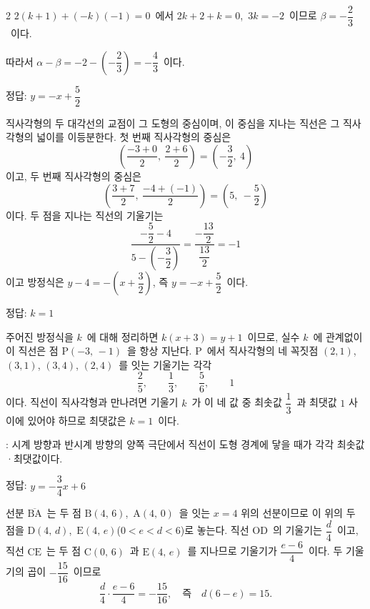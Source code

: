 \documentclass[10pt,fleqn]{article}
\begin{document}
\begin{multicols*}{2}
 $2(k+1) + (-k)(-1) = 0$\ 에서 $2k + 2 + k = 0$,\ $3k = -2$\ 이므로 $\beta = -\dfrac{2}{3}$\ 이다.

따라서 $\alpha - \beta = -2 - \left( -\dfrac{2}{3} \right) = -\dfrac{4}{3}$\ 이다.

\begin{dmanswerbox}
정답: $y=-x+\dfrac{5}{2}$
\end{dmanswerbox}

직사각형의 두 대각선의 교점이 그 도형의 중심이며, 이 중심을 지나는 직선은 그 직사각형의 넓이를 이등분한다. 첫 번째 직사각형의 중심은
\[ \left( \dfrac{-3+0}{2},\ \dfrac{2+6}{2} \right) = \left( -\dfrac{3}{2},\ 4 \right) \]
이고, 두 번째 직사각형의 중심은
\[ \left( \dfrac{3+7}{2},\ \dfrac{-4+(-1)}{2} \right) = \left( 5,\ -\dfrac{5}{2} \right) \]
이다. 두 점을 지나는 직선의 기울기는
\[ \dfrac{-\dfrac{5}{2} - 4}{5 - (-\dfrac{3}{2})} = \dfrac{-\dfrac{13}{2}}{\dfrac{13}{2}} = -1 \]
이고 방정식은 $y - 4 = -\left( x + \dfrac{3}{2} \right)$, 즉 $y = -x + \dfrac{5}{2}$\ 이다.
\begin{dmanswerbox}
정답: $k=1$
\end{dmanswerbox}

주어진 방정식을 $k$\ 에 대해 정리하면 $k(x + 3) = y + 1$\ 이므로, 실수 $k$\ 에 관계없이 이 직선은 점 $\mathrm{P}(-3,\, -1)$\ 을 항상 지난다. $\mathrm{P}$\ 에서 직사각형의 네 꼭짓점 $(2,1)$, $(3,1)$, $(3,4)$, $(2,4)$\ 를 잇는 기울기는 각각
$$\dfrac{2}{5},\qquad \dfrac{1}{3},\qquad \dfrac{5}{6},\qquad 1$$
이다. 직선이 직사각형과 만나려면 기울기 $k$\ 가 이 네 값 중 최솟값 $\dfrac{1}{3}$\ 과 최댓값 $1$ 사이에 있어야 하므로 최댓값은 $k = 1$\ 이다.

\begin{dmcriticalpoint}
: 시계 방향과 반시계 방향의 양쪽 극단에서 직선이 도형 경계에 닿을 때가 각각 최솟값·최댓값이다.
\end{dmcriticalpoint}

\begin{dmanswerbox}
정답: $y=-\dfrac{3}{4}x+6$
\end{dmanswerbox}

선분 $\overline{\mathrm{BA}}$\ 는 두 점 $\mathrm{B}(4,\, 6)$,\ $\mathrm{A}(4,\, 0)$\ 을 잇는 $x=4$ 위의 선분이므로 이 위의 두 점을 $\mathrm{D}(4,\, d)$,\ $\mathrm{E}(4,\, e)$($0 < e < d < 6$)로 놓는다. 직선 $\mathrm{OD}$\ 의 기울기는 $\dfrac{d}{4}$\ 이고, 직선 $\mathrm{CE}$\ 는 두 점 $\mathrm{C}(0,\, 6)$\ 과 $\mathrm{E}(4,\, e)$\ 를 지나므로 기울기가 $\dfrac{e - 6}{4}$\ 이다. 두 기울기의 곱이 $-\dfrac{15}{16}$\ 이므로
\[ \dfrac{d}{4} \cdot \dfrac{e - 6}{4} = -\dfrac{15}{16},\quad \text{즉}\quad d(6 - e) = 15. \tag{$\ast$}\]


\end{multicols*}
\end{document}
